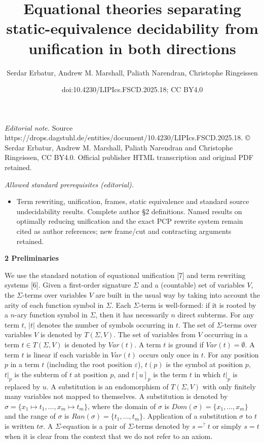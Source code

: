 \documentclass[10pt,a4paper]{amsart}
\title{Equational theories separating static-equivalence decidability from unification in both directions}
\author{Serdar Erbatur, Andrew M. Marshall, Paliath Narendran, Christophe Ringeissen}
\date{doi:10.4230/LIPIcs.FSCD.2025.18; CC BY4.0}
\begin{document}
\maketitle
\noindent\textit{Editorial note.} Source https://drops.dagstuhl.de/entities/document/10.4230/LIPIcs.FSCD.2025.18. © Serdar Erbatur, Andrew M. Marshall, Paliath Narendran and Christophe Ringeissen, CC BY4.0. Official publisher HTML transcription and original PDF retained.\par\medskip
\noindent\textit{Allowed standard prerequisites (editorial).}\begin{itemize}
\item Term rewriting, unification, frames, static equivalence and standard source undecidability results. Complete author §2 definitions. Named results on optimally reducing unification and the exact PCP rewrite system remain cited as author references; new frame/cut and contracting arguments retained.
\end{itemize}\medskip
 
\par\medskip\noindent\textbf{2 Preliminaries}\par
 
 
We use the standard notation of equational unification [7] and term rewriting systems [6]. Given a first-order signature $\Sigma$ and a (countable) set of variables $V$, the $\Sigma$-terms over variables $V$ are built in the usual way by taking into account the arity of each function symbol in $\Sigma$. Each $\Sigma$-term is well-formed: if it is rooted by a $n$-ary function symbol in $\Sigma$, then it has necessarily $n$ direct subterms. For any term $t$, $|t|$ denotes the number of symbols occurring in $t$. The set of $\Sigma$-terms over variables $V$ is denoted by $T(\Sigma,V)$. The set of variables from $V$ occurring in a term $t\in T(\Sigma,V)$ is denoted by $\mathit{Var}(t)$. A term $t$ is ground if $\mathit{Var}(t)=\emptyset$. A term $t$ is linear if each variable in $\mathit{Var}(t)$ occurs only once in $t$. For any position $p$ in a term $t$ (including the root position $\varepsilon$), $t(p)$ is the symbol at position $p$, $t|_{p}$ is the subterm of $t$ at position $p$, and $t[u]_{p}$ is the term $t$ in which $t|_{p}$ is replaced by $u$. A substitution is an endomorphism of $T(\Sigma,V)$ with only finitely many variables not mapped to themselves. A substitution is denoted by $\sigma=\{x_{1}\mapsto t_{1},\dots,x_{m}\mapsto t_{m}\}$, where the domain of $\sigma$ is $Dom(\sigma)=\{x_{1},\dots,x_{m}\}$ and the range of $\sigma$ is $Ran(\sigma)=\{t_{1},\dots,t_{m}\}$. Application of a substitution $\sigma$ to $t$ is written $t\sigma$. A $\Sigma$-equation is a pair of $\Sigma$-terms denoted by $s=^{?}t$ or simply $s=t$ when it is clear from the context that we do not refer to an axiom.\par
 
\end{document}
